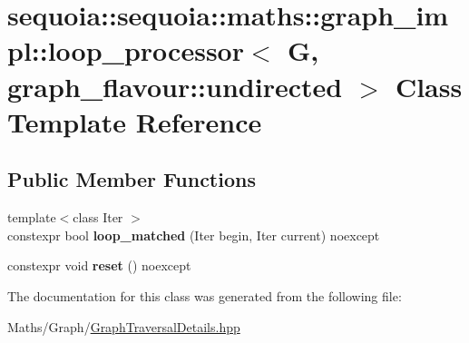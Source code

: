 \hypertarget{classsequoia_1_1sequoia_1_1maths_1_1graph__impl_1_1loop__processor_3_01_g_00_01graph__flavour_1_1undirected_01_4}{}\section{sequoia\+::sequoia\+::maths\+::graph\+\_\+impl\+::loop\+\_\+processor$<$ G, graph\+\_\+flavour\+::undirected $>$ Class Template Reference}
\label{classsequoia_1_1sequoia_1_1maths_1_1graph__impl_1_1loop__processor_3_01_g_00_01graph__flavour_1_1undirected_01_4}
\subsection*{Public Member Functions}
\begin{DoxyCompactItemize}
\item 
\mbox{\label{classsequoia_1_1sequoia_1_1maths_1_1graph__impl_1_1loop__processor_3_01_g_00_01graph__flavour_1_1undirected_01_4_a24b8a459e7b7bea953bd343a0bca851e}} 
{\footnotesize template$<$class Iter $>$ }\\constexpr bool {\bfseries loop\+\_\+matched} (Iter begin, Iter current) noexcept
\item 
\mbox{\label{classsequoia_1_1sequoia_1_1maths_1_1graph__impl_1_1loop__processor_3_01_g_00_01graph__flavour_1_1undirected_01_4_af2be9217e327fd8e6eafb978eb297dd4}} 
constexpr void {\bfseries reset} () noexcept
\end{DoxyCompactItemize}


The documentation for this class was generated from the following file\+:\begin{DoxyCompactItemize}
\item 
Maths/\+Graph/\mbox{\hyperlink{_graph_traversal_details_8hpp}{Graph\+Traversal\+Details.\+hpp}}\end{DoxyCompactItemize}
